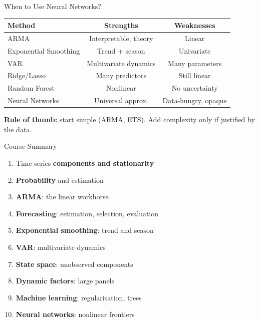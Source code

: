 \documentclass[aspectratio=169, 10pt]{beamer}
\begin{document}
\begin{frame}{When to Use Neural Networks?}
\begin{center}
\begin{tabular}{lcc}
\toprule
\textbf{Method} & \textbf{Strengths} & \textbf{Weaknesses} \\
\midrule
ARMA & Interpretable, theory & Linear \\
Exponential Smoothing & Trend + season & Univariate \\
VAR & Multivariate dynamics & Many parameters \\
Ridge/Lasso & Many predictors & Still linear \\
Random Forest & Nonlinear & No uncertainty \\
\alert{Neural Networks} & \alert{Universal approx.} & \alert{Data-hungry, opaque} \\
\bottomrule
\end{tabular}
\end{center}

\vspace{0.5em}
\textbf{Rule of thumb:} start simple (ARMA, ETS). Add complexity only if justified by the data.
\end{frame}

\begin{frame}{Course Summary}
\begin{enumerate}
    \item Time series \textbf{components and stationarity}
    \item \textbf{Probability} and estimation
    \item \textbf{ARMA}: the linear workhorse
    \item \textbf{Forecasting}: estimation, selection, evaluation
    \item \textbf{Exponential smoothing}: trend and season
    \item \textbf{VAR}: multivariate dynamics
    \item \textbf{State space}: unobserved components
    \item \textbf{Dynamic factors}: large panels
    \item \textbf{Machine learning}: regularisation, trees
    \item \textbf{Neural networks}: nonlinear frontiers
\end{enumerate}
\end{frame}
\end{document}
